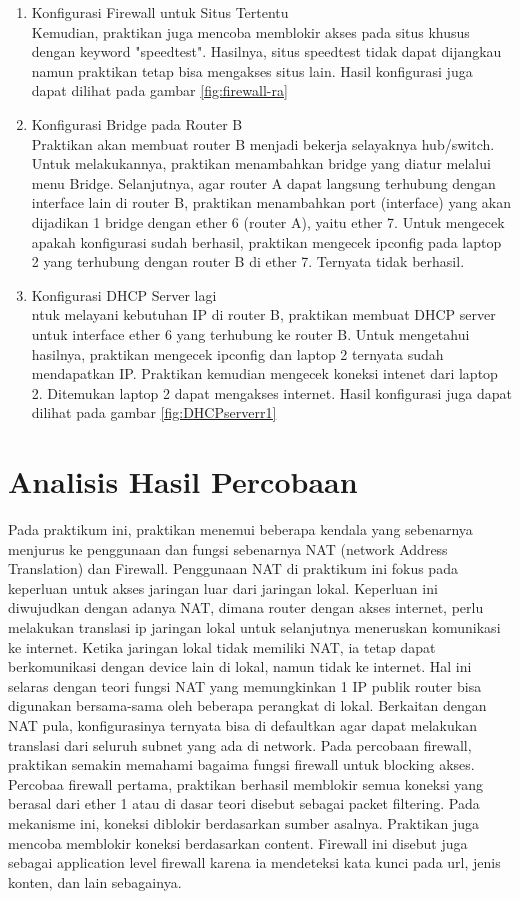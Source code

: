 \begin{enumerate}
  \item Konfigurasi Firewall untuk Situs Tertentu\\
  Kemudian, praktikan juga mencoba memblokir akses pada situs khusus dengan keyword "speedtest". Hasilnya, situs speedtest tidak dapat dijangkau namun praktikan tetap bisa mengakses situs lain. Hasil konfigurasi juga dapat dilihat pada gambar \ref{fig:firewall-ra}
  \item Konfigurasi Bridge pada Router B \\
  Praktikan akan membuat router B menjadi bekerja selayaknya hub/switch. Untuk melakukannya, praktikan menambahkan bridge yang diatur melalui menu Bridge. Selanjutnya, agar router A dapat langsung terhubung dengan interface lain di router B, praktikan menambahkan port (interface) yang akan dijadikan 1 bridge dengan ether 6 (router A), yaitu ether 7. Untuk mengecek apakah konfigurasi sudah berhasil, praktikan mengecek ipconfig pada laptop 2 yang terhubung dengan router B di ether 7. Ternyata tidak berhasil. 
  \item Konfigurasi DHCP Server lagi \\
  ntuk melayani kebutuhan IP di router B, praktikan membuat DHCP server untuk interface ether 6 yang terhubung ke router B. Untuk mengetahui hasilnya, praktikan mengecek ipconfig dan laptop 2 ternyata sudah mendapatkan IP. Praktikan kemudian mengecek koneksi intenet dari laptop 2. Ditemukan laptop 2 dapat mengakses internet. Hasil konfigurasi juga dapat dilihat pada gambar \ref{fig:DHCPserverr1}
\end{enumerate}

\section{Analisis Hasil Percobaan}
Pada praktikum ini, praktikan menemui beberapa kendala yang sebenarnya menjurus ke penggunaan dan fungsi sebenarnya NAT (network Address Translation) dan Firewall. Penggunaan NAT di praktikum ini fokus pada keperluan untuk akses jaringan luar dari jaringan lokal. Keperluan ini diwujudkan dengan adanya NAT, dimana router dengan akses internet, perlu melakukan translasi ip jaringan lokal untuk selanjutnya meneruskan komunikasi ke internet. Ketika jaringan lokal tidak memiliki NAT, ia tetap dapat berkomunikasi dengan device lain di lokal, namun tidak ke internet. Hal ini selaras dengan teori fungsi NAT yang memungkinkan 1 IP publik router bisa digunakan bersama-sama oleh beberapa perangkat di lokal. Berkaitan dengan NAT pula, konfigurasinya ternyata bisa di defaultkan agar dapat melakukan translasi dari seluruh subnet yang ada di network. Pada percobaan firewall, praktikan semakin memahami bagaima fungsi firewall untuk blocking akses.  Percobaa firewall pertama, praktikan berhasil memblokir semua koneksi yang berasal dari ether 1 atau di dasar teori disebut sebagai packet filtering. Pada mekanisme ini, koneksi diblokir berdasarkan sumber asalnya. Praktikan juga mencoba memblokir koneksi berdasarkan content. Firewall ini disebut juga sebagai application level firewall karena ia mendeteksi kata kunci pada url, jenis konten, dan lain sebagainya.

